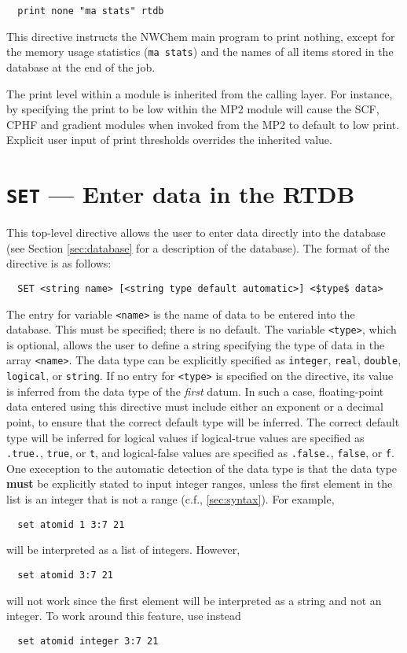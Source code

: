 \begin{verbatim}
  print none "ma stats" rtdb
\end{verbatim}

This directive instructs the NWChem main program to print nothing,
except for the memory usage statistics (\verb+ma stats+) and
the names of all items stored in the database at the end of the job.

The print level within a module is inherited from the 
calling layer.  For instance, by specifying the print to be low
within the MP2 module will cause the SCF, CPHF and gradient modules
when invoked from the MP2 to default to low print.  Explicit user
input of print thresholds overrides the inherited value.

\section{{\tt SET} --- Enter data in the RTDB}
\label{sec:set}

This top-level directive allows the user to enter data directly into the
database (see Section \ref{sec:database} for a description of the database).
The format of the directive is as follows:

\begin{verbatim}
  SET <string name> [<string type default automatic>] <$type$ data>
\end{verbatim}

The entry for variable \verb+<name>+ is the name of 
data to be entered into the database.  This must be specified; there is no default.  The variable \verb+<type>+, which is
optional, allows the user to define a string specifying the type of
data in the array \verb+<name>+.  The data type can be explicitly
specified as \verb+integer+, \verb+real+, \verb+double+,
\verb+logical+, or \verb+string+.  If no entry for \verb+<type>+ is
specified on the directive, its value is inferred from the data type
of the {\em first} datum.  In such a case, floating-point data
entered using this directive must include either an exponent or a
decimal point, to ensure that the correct default type will be
inferred.  The correct default type will be inferred for logical
values if logical-true values are specified as \verb+.true.+,
\verb+true+, or \verb+t+, and logical-false values are specified as
\verb+.false.+, \verb+false+, or \verb+f+.  One exeception to the
automatic detection of the data type is that the data type {\bf must}
be explicitly stated to input integer ranges, unless the first
element in the list is an integer that is not a range (c.f.,
\ref{sec:syntax}).  For example,
\begin{verbatim}
  set atomid 1 3:7 21
\end{verbatim}
will be interpreted as a list of integers.  However, 
\begin{verbatim}
  set atomid 3:7 21
\end{verbatim}
will not work since the first element will be interpreted as a
string and not an integer.  To work around this feature, use instead
\begin{verbatim}
  set atomid integer 3:7 21
\end{verbatim}


